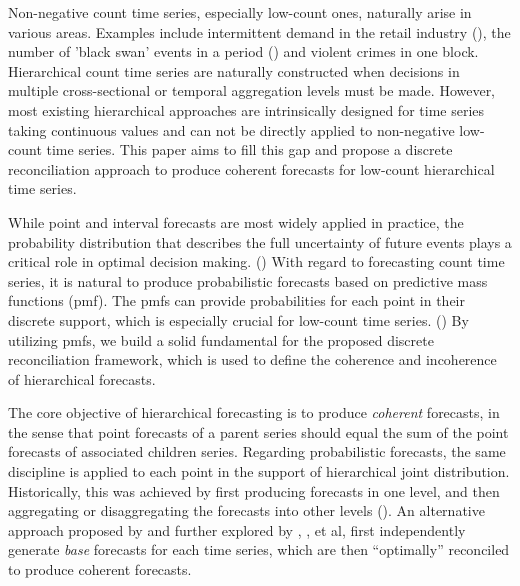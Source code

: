 \documentclass[a4paper,review,12pt,authoryear]{elsarticle}
\begin{document}
Non-negative count time series, especially low-count ones, naturally arise in various areas. 
Examples include intermittent demand in the retail industry (\citealp{kourentzesElucidateStructureIntermittent2021}), the number of 'black swan' events in a period (\citealp{nikolopoulosWeNeedTalk2020}) and violent crimes in one block.
Hierarchical count time series are naturally constructed when decisions in multiple cross-sectional or temporal aggregation levels must be made.
However, most existing hierarchical approaches are intrinsically designed for time series taking continuous values and can not be directly applied to non-negative low-count time series. 
This paper aims to fill this gap and propose a discrete reconciliation approach to produce coherent forecasts for low-count hierarchical time series.

While point and interval forecasts are most widely applied in practice, 
the probability distribution that describes the full uncertainty of future events plays a critical role in optimal decision making. (\citealp{gneitingProbabilisticForecasting2014}) 
With regard to forecasting count time series, it is natural to produce probabilistic forecasts based on predictive mass functions (pmf). 
The pmfs can provide probabilities for each point in their discrete support,
which is especially crucial for low-count time series. (\citealp{petropoulosForecastingTheoryPractice2022a})
By utilizing pmfs, we build a solid fundamental for the proposed discrete reconciliation framework, which is used to define the coherence and incoherence of hierarchical forecasts.

The core objective of hierarchical forecasting is to produce \textit{coherent} forecasts, 
in the sense that point forecasts of a parent series should equal the sum of the point forecasts of associated children series. 
Regarding probabilistic forecasts, the same discipline is applied to each point in the support of hierarchical joint distribution.
Historically, this was achieved by first producing forecasts in one level, 
and then aggregating or disaggregating the forecasts into other levels (\citealp{fliednerHierarchicalForecastingIssues2001}). 
An alternative approach proposed by \cite{hyndmanOptimalCombinationForecasts2011} and further explored by \cite{wickramasuriyaOptimalForecastReconciliation2019}, \cite{ anagiotelisForecastReconciliationGeometric2021}, et al, 
first independently generate \textit{base} forecasts for each time series, 
which are then ``optimally'' reconciled to produce coherent forecasts.
\end{document}
